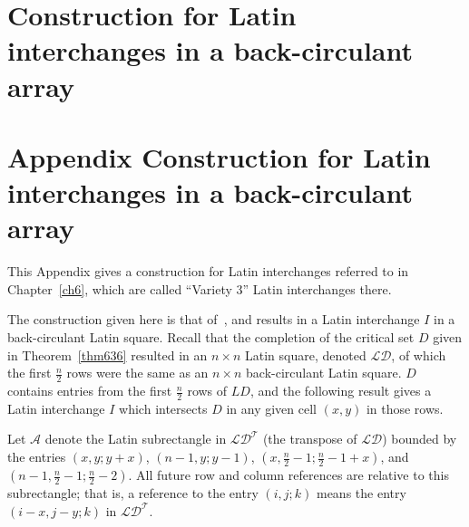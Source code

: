 \documentclass[12pt]{report}
\begin{document}

\iflatexml
  \chapter{Construction for Latin interchanges in a back-circulant array}\label{app3}
\else
  \chapter*{Appendix \thechapter\newline\newline Construction for Latin interchanges in a back-circulant array}\label{app3}
  \vspace{0.5cm}
\fi

This Appendix gives a construction for Latin interchanges referred
to in Chapter~\ref{ch6}, which are called ``Variety 3'' Latin interchanges there.

The construction given here is that of~\cite{MR1758263}, and results
in a Latin interchange $I$ in a back-circulant Latin square.  Recall that the
completion of the critical set $D$ given in Theorem~\ref{thm636} resulted in an $n
\times n$ Latin square, denoted $\mathcal{LD}$, of which the first
$\displaystyle{\frac{n}{2}}$ rows were the same as an $n \times n$ back-circulant
Latin square.  $D$ contains entries from the first $\displaystyle{\frac{n}{2}}$
rows of $LD$, and the following result gives a Latin interchange $I$
which intersects $D$ in any given cell $(x,y)$ in those rows.

Let $\mathcal{A}$ denote the Latin subrectangle in $\mathcal{LD^{T}}$ (the
transpose of $\mathcal{LD}$)
bounded by the entries
$(x, y; y+x)$, $(n-1, y; y - 1)$,
$(x, \displaystyle{\frac{n}{2}} - 1; \displaystyle{\frac{n}{2}} - 1 + x)$, and
$(n-1, \displaystyle{\frac{n}{2}} - 1; \displaystyle{\frac{n}{2}} - 2)$.
All future row and column references are relative to this subrectangle;
that is, a reference to the entry $(i, j; k)$ means the entry $(i-x,j-y;k)$
in $\mathcal{LD^{T}}$.
\end{document}
